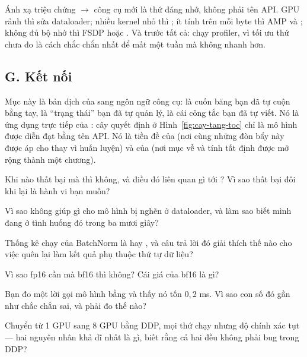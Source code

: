 \documentclass[../../../deep_learning.tex]{subfiles}
\begin{document}
\begin{cannho}
Ánh xạ triệu chứng \(\rightarrow\) công cụ mới là thứ đáng nhớ, không phải tên API. GPU rảnh thì sửa dataloader; nhiều kernel nhỏ thì ; ít tính trên mỗi byte thì AMP và ; không đủ bộ nhớ thì FSDP hoặc . Và trước tất cả: chạy profiler, vì tối ưu thứ chưa đo là cách chắc chắn nhất để mất một tuần mà không nhanh hơn. 
\end{cannho}

\subsection{G. Kết nối}
Mục này là bản dịch của  sang ngôn ngữ công cụ:  là cuốn băng bạn đã tự cuộn bằng tay,  là ``trạng thái'' bạn đã tự quản lý,  là cái công tắc bạn đã tự viết. Nó là ứng dụng trực tiếp của : cây quyết định ở Hình~\ref{fig:cay-tang-toc} chỉ là mô hình  được diễn đạt bằng tên API. Nó là tiền đề của  (nơi cùng những đòn bẩy này được áp cho  thay vì huấn luyện) và của  (nơi mục về  và tính tất định được mở rộng thành một chương).

\begin{tukiem}
\item Khi nào  thất bại mà  thì không, và điều đó liên quan gì tới ? Vì sao thất bại đôi khi lại là hành vi bạn muốn?
\item Vì sao  không giúp gì cho mô hình bị nghẽn ở dataloader, và làm sao biết mình đang ở tình huống đó trong ba mươi giây?
\item Thống kê chạy của BatchNorm là  hay , và câu trả lời đó giải thích thế nào cho việc quên  lại làm kết quả phụ thuộc thứ tự dữ liệu?
\item Vì sao fp16 cần  mà bf16 thì không? Cái giá của bf16 là gì?
\item Bạn đo một lời gọi mô hình bằng  và thấy nó tốn $0{,}2$ ms. Vì sao con số đó gần như chắc chắn sai, và phải đo thế nào?
\item Chuyển từ 1 GPU sang 8 GPU bằng DDP, mọi thứ chạy nhưng độ chính xác tụt --- hai nguyên nhân khả dĩ nhất là gì, biết rằng cả hai đều không phải bug trong DDP?
\end{tukiem}
\ifSubfilesClassLoaded{\printbibliography[title={Nguồn}]}{}
\end{document}
